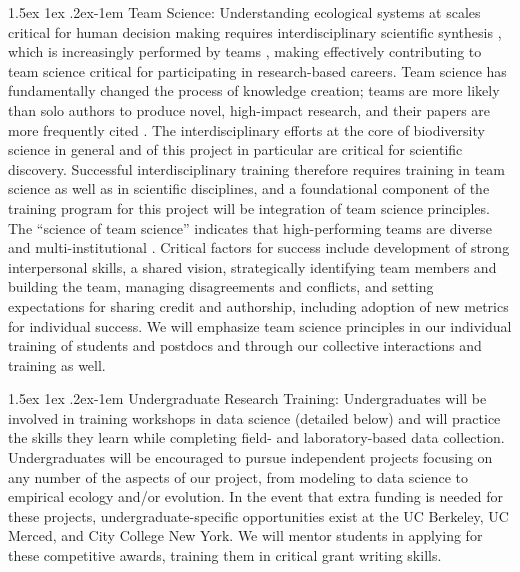 \documentclass[11pt]{article}
\makeatletter
\renewcommand{\paragraph}{\@startsection{paragraph}{4}{\z@}
  {1.5ex \@plus 1ex \@minus .2ex}{-1em}
  {\normalfont\normalsize\it}
}
\makeatother
\begin{document}
\paragraph{Team Science:} Understanding ecological systems at scales
critical for human decision making requires interdisciplinary
scientific synthesis \citep{goring2014}, which is increasingly
performed by teams \citep{wuchty2007}, making effectively contributing
to team science critical for participating in research-based careers. Team
science has fundamentally changed the process of knowledge creation;
teams are more likely than solo authors to produce novel, high-impact
research, and their papers are more frequently cited
\citep{wuchty2007}. The interdisciplinary efforts at the core of
biodiversity science in general and of this project in particular are
critical for scientific discovery. Successful interdisciplinary
training therefore requires training in team science as well as in
scientific disciplines, and a foundational component of the training
program for this project will be integration of team science
principles.  The ``science of team science'' indicates that
high-performing teams are diverse \citep{cheruvelil2014} and
multi-institutional \citep{jones2008}. Critical factors for success
include development of strong interpersonal skills, a shared vision,
strategically identifying team members and building the team, managing
disagreements and conflicts, and setting expectations for sharing
credit and authorship\citep{goring2014, cheruvelil2014}, including
adoption of new metrics for individual success. We will emphasize team
science principles in our individual training of students and postdocs
and through our collective interactions and training as well.

\paragraph{Undergraduate Research Training:} Undergraduates will be
involved in training workshops in data science (detailed below) and
will practice the skills they learn while completing field- and
laboratory-based data collection. Undergraduates will be encouraged to
pursue independent projects focusing on any number of the aspects of
our project, from modeling to data science to empirical ecology and/or
evolution. In the event that extra funding is needed for these
projects, undergraduate-specific opportunities exist at the UC
Berkeley, UC Merced, and City College New York. We will mentor
students in applying for these competitive awards, training them in
critical grant writing skills.
\end{document}
